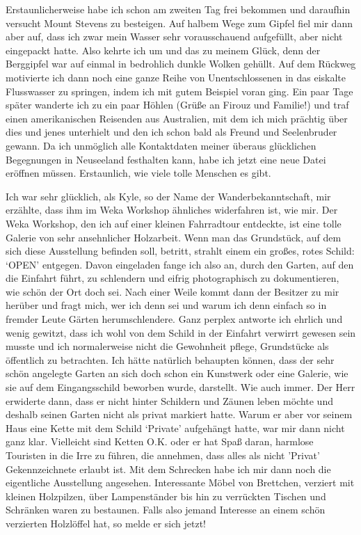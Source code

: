 Erstaunlicherweise habe ich schon am zweiten Tag frei bekommen und
daraufhin versucht Mount Stevens zu besteigen. Auf halbem Wege zum
Gipfel fiel mir dann aber auf, dass ich zwar mein Wasser sehr
vorausschauend aufgefüllt, aber nicht eingepackt hatte. Also kehrte ich
um und das zu meinem Glück, denn der Berggipfel war auf einmal in
bedrohlich dunkle Wolken gehüllt. Auf dem Rückweg motivierte ich dann
noch eine ganze Reihe von Unentschlossenen in das eiskalte Flusswasser
zu springen, indem ich mit gutem Beispiel voran ging. Ein paar Tage
später wanderte ich zu ein paar Höhlen (Grüße an Firouz und Familie!)
und traf einen amerikanischen Reisenden aus Australien, mit dem ich mich
prächtig über dies und jenes unterhielt und den ich schon bald als
Freund und Seelenbruder gewann. Da ich unmöglich alle Kontaktdaten
meiner überaus glücklichen Begegnungen in Neuseeland festhalten kann,
habe ich jetzt eine neue Datei eröffnen müssen. Erstaunlich, wie viele
tolle Menschen es gibt.

Ich war sehr glücklich, als Kyle, so der Name der Wanderbekanntschaft,
mir erzählte, dass ihm im Weka Workshop ähnliches widerfahren ist, wie
mir. Der Weka Workshop, den ich auf einer kleinen Fahrradtour entdeckte,
ist eine tolle Galerie von sehr ansehnlicher Holzarbeit. Wenn man das
Grundstück, auf dem sich diese Ausstellung befinden soll, betritt,
strahlt einem ein großes, rotes Schild: `OPEN' entgegen. Davon
eingeladen fange ich also an, durch den Garten, auf den die Einfahrt
führt, zu schlendern und eifrig photographisch zu dokumentieren, wie
schön der Ort doch sei. Nach einer Weile kommt dann der Besitzer zu mir
herüber und fragt mich, wer ich denn sei und warum ich denn einfach so
in fremder Leute Gärten herumschlendere. Ganz perplex antworte ich
ehrlich und wenig gewitzt, dass ich wohl von dem Schild in der Einfahrt
verwirrt gewesen sein musste und ich normalerweise nicht die Gewohnheit
pflege, Grundstücke als öffentlich zu betrachten. Ich hätte natürlich
behaupten können, dass der sehr schön angelegte Garten an sich doch
schon ein Kunstwerk oder eine Galerie, wie sie auf dem Eingangsschild
beworben wurde, darstellt. Wie auch immer. Der Herr erwiderte dann, dass
er nicht hinter Schildern und Zäunen leben möchte und deshalb seinen
Garten nicht als privat markiert hatte. Warum er aber vor seinem Haus
eine Kette mit dem Schild `Private' aufgehängt hatte, war mir dann nicht
ganz klar. Vielleicht sind Ketten O.K. oder er hat Spaß daran, harmlose
Touristen in die Irre zu führen, die annehmen, dass alles als nicht
'Privat' Gekennzeichnete erlaubt ist. Mit dem Schrecken habe ich mir
dann noch die eigentliche Ausstellung angesehen. Interessante Möbel von
Brettchen, verziert mit kleinen Holzpilzen, über Lampenständer bis hin
zu verrückten Tischen und Schränken waren zu bestaunen. Falls also
jemand Interesse an einem schön verzierten Holzlöffel hat, so melde er
sich jetzt!

